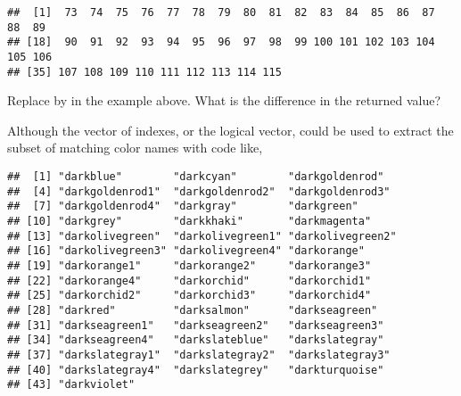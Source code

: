 \documentclass[krantz2]{krantz}\usepackage{knitr}%
\begin{document}
\begin{knitrout}\footnotesize
{}\color{fgcolor}\begin{kframe}
\begin{alltt}
\hlstd{(}\hlstd{,}\hlstd{())}
\end{alltt}
\begin{verbatim}
##  [1]  73  74  75  76  77  78  79  80  81  82  83  84  85  86  87  88  89
## [18]  90  91  92  93  94  95  96  97  98  99 100 101 102 103 104 105 106
## [35] 107 108 109 110 111 112 113 114 115
\end{verbatim}
\end{kframe}
\end{knitrout}

\begin{playground}
Replace  by  in the example above. What is the difference in the returned value?
\end{playground}

Although the vector of indexes, or the logical vector, could be used to extract the subset of matching color names with code like,

\begin{knitrout}\footnotesize
{}\color{fgcolor}\begin{kframe}
\begin{alltt}
\hlstd{()[}\hlstd{(}\hlstd{,} \hlstd{())]}
\end{alltt}
\begin{verbatim}
##  [1] "darkblue"        "darkcyan"        "darkgoldenrod"  
##  [4] "darkgoldenrod1"  "darkgoldenrod2"  "darkgoldenrod3" 
##  [7] "darkgoldenrod4"  "darkgray"        "darkgreen"      
## [10] "darkgrey"        "darkkhaki"       "darkmagenta"    
## [13] "darkolivegreen"  "darkolivegreen1" "darkolivegreen2"
## [16] "darkolivegreen3" "darkolivegreen4" "darkorange"     
## [19] "darkorange1"     "darkorange2"     "darkorange3"    
## [22] "darkorange4"     "darkorchid"      "darkorchid1"    
## [25] "darkorchid2"     "darkorchid3"     "darkorchid4"    
## [28] "darkred"         "darksalmon"      "darkseagreen"   
## [31] "darkseagreen1"   "darkseagreen2"   "darkseagreen3"  
## [34] "darkseagreen4"   "darkslateblue"   "darkslategray"  
## [37] "darkslategray1"  "darkslategray2"  "darkslategray3" 
## [40] "darkslategray4"  "darkslategrey"   "darkturquoise"  
## [43] "darkviolet"
\end{verbatim}
\end{kframe}
\end{knitrout}
\end{document}
